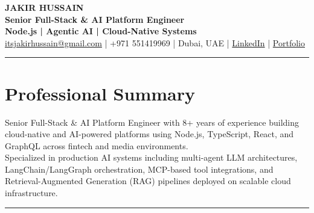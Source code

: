 \documentclass[10pt,a4paper]{article}
\newcommand{\NameSize}{\fontsize{22}{24}\selectfont}
\newcommand{\TitleSize}{\fontsize{10.8}{13}\selectfont}
\newcommand{\TagSize}{\fontsize{10}{12}\selectfont}
\newcommand{\BodySize}{\fontsize{9.7}{12}\selectfont}
\newcommand{\SmallBody}{\fontsize{9.2}{11.4}\selectfont}
\newcommand{\topdivider}{\color{rulecolor}\rule{\linewidth}{0.5pt}\color{primary}\vspace{0pt}}
\begin{document}
\BodySize

\begin{center}

{\NameSize \bfseries JAKIR HUSSAIN}\\[4pt]
{\TitleSize \bfseries Senior Full-Stack \& AI Platform Engineer}\\[2pt]
{\TagSize \bfseries Node.js \;|\; Agentic AI \;|\; Cloud-Native Systems}\\[6pt]

\href{mailto:itsjakirhussain@gmail.com}{itsjakirhussain@gmail.com} \;|\;
+971 551419969 \;|\;
Dubai, UAE \;|\;
\href{https://linkedin.com/in/iam-hussain}{LinkedIn} \;|\;
\href{https://iam-hussain.site}{Portfolio}

\end{center}
\vspace{-8pt}
\topdivider
\vspace{2pt}
\section*{Professional Summary}
\SmallBody
Senior Full-Stack \& AI Platform Engineer with 8+ years of experience building cloud-native and AI-powered platforms using Node.js, TypeScript, React, and GraphQL across fintech and media environments.\\[5pt]

Specialized in production AI systems including multi-agent LLM architectures, LangChain/LangGraph orchestration, MCP-based tool integrations, and Retrieval-Augmented Generation (RAG) pipelines deployed on scalable cloud infrastructure.\\[8pt]

\vspace{-8pt}
\topdivider
\vspace{2pt}
\end{document}
